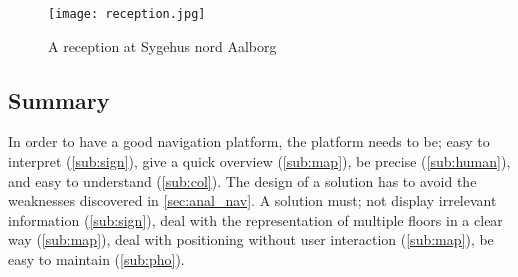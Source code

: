   \begin{figure}[ht!]
    \centering
    \texttt{[image: reception.jpg]}
    \caption{A reception at Sygehus nord Aalborg}
    \label{fig:rec_booth}
  \end{figure}

\subsection{Summary} %
  In order to have a good navigation platform, the platform needs to be; easy to interpret (\cref{sub:sign}), give a quick overview (\cref{sub:map}), be precise (\cref{sub:human}), and easy to understand (\cref{sub:col}). The design of a solution has to avoid the weaknesses discovered in \cref{sec:anal_nav}. A solution must; not display irrelevant information (\cref{sub:sign}), deal with the representation of multiple floors in a clear way (\cref{sub:map}), deal with positioning without user interaction (\cref{sub:map}), be easy to maintain (\cref{sub:pho}).